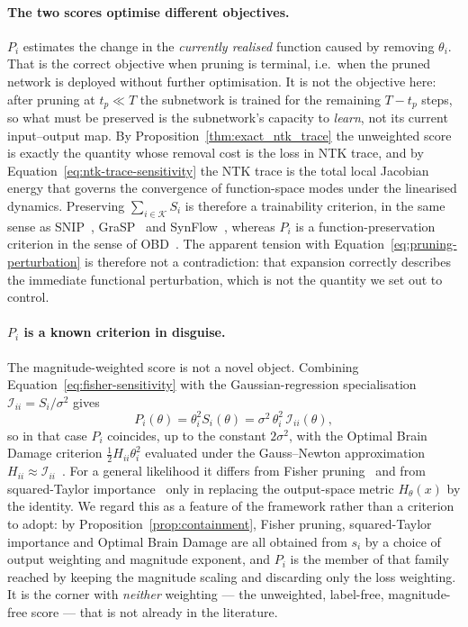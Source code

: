 \documentclass{article}
\theoremstyle{definition}
\theoremstyle{remark}
\begin{document}
\paragraph{The two scores optimise different objectives.} $P_i$ estimates the
change in the \emph{currently realised} function caused by removing
$\theta_i$. That is the correct objective when pruning is terminal, i.e.\ when
the pruned network is deployed without further optimisation. It is not the
objective here: after pruning at $t_p\ll T$ the subnetwork is trained for the
remaining $T-t_p$ steps, so what must be preserved is the subnetwork's capacity
to \emph{learn}, not its current input--output map. By
Proposition~\ref{thm:exact_ntk_trace} the unweighted score is exactly the
quantity whose removal cost is the loss in NTK trace, and by
Equation~\eqref{eq:ntk-trace-sensitivity} the NTK trace is the total local
Jacobian energy that governs the convergence of function-space modes under the
linearised dynamics. Preserving $\sum_{i\in\mathcal K}S_i$ is therefore a
trainability criterion, in the same sense as
SNIP~\cite{lee2019snip}, GraSP~\cite{wang2020grasp} and
SynFlow~\cite{tanaka2020synflow}, whereas $P_i$ is a function-preservation
criterion in the sense of OBD~\cite{lecun1990obd}. The apparent tension with
Equation~\eqref{eq:pruning-perturbation} is therefore not a contradiction: that
expansion correctly describes the immediate functional perturbation, which is
not the quantity we set out to control.

\paragraph{$P_i$ is a known criterion in disguise.} The magnitude-weighted score
is not a novel object. Combining
Equation~\eqref{eq:fisher-sensitivity} with the Gaussian-regression
specialisation $\mathcal I_{ii}=S_i/\sigma^2$ gives
\[
P_i(\theta)
=
\theta_i^2 S_i(\theta)
=
\sigma^2\,\theta_i^2\,\mathcal I_{ii}(\theta),
\]
so in that case $P_i$ coincides, up to the constant $2\sigma^2$, with the
Optimal Brain Damage criterion $\tfrac12 H_{ii}\theta_i^2$ evaluated under the
Gauss--Newton approximation $H_{ii}\approx\mathcal I_{ii}$~\cite{lecun1990obd,
hassibi1993obs}. For a general likelihood it differs from Fisher
pruning~\cite{theis2018fisher} and from squared-Taylor
importance~\cite{molchanov2019importance} only in replacing the output-space
metric $H_\theta(x)$ by the identity. We regard this as a feature of the
framework rather than a criterion to adopt: by
Proposition~\ref{prop:containment}, Fisher pruning, squared-Taylor importance
and Optimal Brain Damage are all obtained from $s_i$ by a choice of output
weighting and magnitude exponent, and $P_i$ is the member of that family
reached by keeping the magnitude scaling and discarding only the loss weighting.
It is the corner with \emph{neither} weighting --- the unweighted, label-free,
magnitude-free score --- that is not already in the literature.
\end{document}
